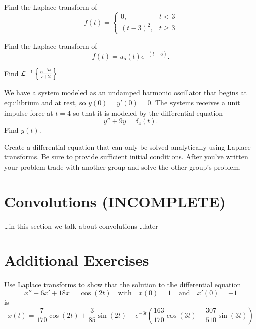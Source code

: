 \begin{problem}
    Find the Laplace transform of
    \[ f(t) = \left\{ \begin{array}{cc} 0, & t < 3 \\ (t-3)^2, & t \ge 3 \end{array} \right.
    \]
\end{problem}

\begin{problem}
    Find the Laplace transform of
    \[ f(t) = u_5(t) e^{-(t-5)}. \]
\end{problem}
\solution{
    \[ \lap{u_5(t) e^{-(t-5)}} = \frac{e^{-5s}}{s+1} \]
}

\begin{problem}
    Find $\mathcal{L}^{-1}\left\{ \frac{e^{-3s}}{s+2} \right\}$
\end{problem}
\solution{
    \[ \lapinv{\frac{e^{-3s}}{s+2}} = u_3(t) e^{-2(t-3)} \]
}



\begin{problem}
    We have a system modeled as an undamped harmonic oscillator that begins at equilibrium
    and at rest, so $y(0) = y'(0) = 0$.  The systems receives a unit impulse force at $t=4$ so
    that it is modeled by the differential equation
    \[ y'' + 9y = \delta_4(t). \]
    Find $y(t)$.
\end{problem}
\solution{
    \[ y(t) = u_4(t) \sin(3(t-4)). \]
}

\begin{problem}
    Create a differential equation that can only be solved analytically using Laplace
    transforms.  Be sure to provide sufficient initial conditions.  After you've written
    your problem trade with another group and solve the other group's problem.
\end{problem}


\newpage\section{Convolutions (INCOMPLETE)}
\ldots in this section we talk about convolutions \ldots later



\newpage\section{Additional Exercises}



\begin{problem}
    Use Laplace transforms to show that the solution to the differential equation
    \[ x'' + 6x' + 18x = \cos(2t) \quad \text{with} \quad x(0) = 1 \quad \text{and} \quad x'(0) =
    -1 \]
    is
    \[ x(t) = \frac{7}{170} \cos(2t) + \frac{3}{85} \sin(2t) + e^{-3t} \left(
        \frac{163}{170} \cos(3t) + \frac{307}{510} \sin(3t)
    \right) \]
\end{problem}


